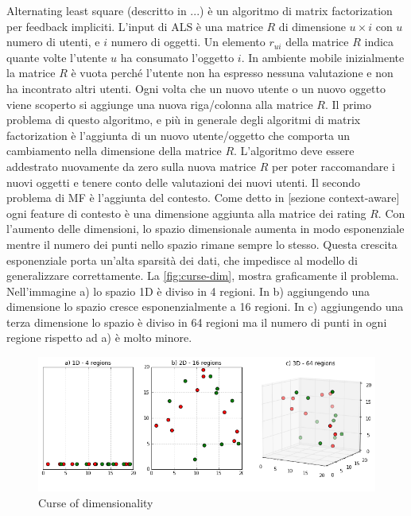 Alternating least square (descritto in ...) è un algoritmo di matrix factorization per feedback impliciti. L'input di ALS è una matrice $R$ di dimensione $u \times i$ con $u$ numero di utenti, e $i$ numero di oggetti. Un elemento $r_{ui}$ della matrice $R$ indica quante volte l'utente $u$ ha consumato l'oggetto $i$. In ambiente mobile inizialmente la matrice $R$ è vuota perché l'utente non ha espresso nessuna valutazione e non ha incontrato altri utenti. Ogni volta che un nuovo utente o un nuovo oggetto viene scoperto si aggiunge una nuova riga/colonna alla matrice $R$. Il primo problema di questo algoritmo, e più in generale degli algoritmi di matrix factorization è l'aggiunta di un nuovo utente/oggetto che comporta un cambiamento nella dimensione della matrice $R$. L'algoritmo deve essere addestrato nuovamente da zero sulla nuova matrice $R$ per poter raccomandare i nuovi oggetti e tenere conto delle valutazioni dei nuovi utenti. Il secondo problema di MF è l'aggiunta del contesto. Come detto in [sezione context-aware] ogni feature di contesto è una dimensione aggiunta alla matrice dei rating $R$. Con l'aumento delle dimensioni, lo spazio dimensionale aumenta in modo esponenziale \cite{curse-of-dim} mentre il numero dei punti nello spazio rimane sempre lo stesso. Questa crescita esponenziale porta un'alta sparsità dei dati, che impedisce al modello di generalizzare correttamente. La \autoref{fig:curse-dim}, mostra graficamente il problema. Nell'immagine a) lo spazio 1D è diviso in 4 regioni. In b) aggiungendo una dimensione lo spazio cresce esponenzialmente a 16 regioni. In c) aggiungendo una terza dimensione lo spazio è diviso in 64 regioni ma il numero di punti in ogni regione rispetto ad a) è molto minore.

\begin{figure}
  \includegraphics[width=\linewidth]{immagini/curse_of_dimensionality.png}
  \caption{Curse of dimensionality}
  \label{fig:curse-dim}
\end{figure}

